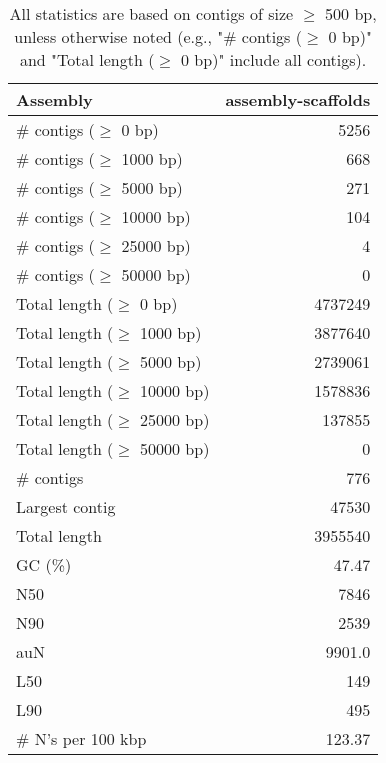 \documentclass[12pt,a4paper]{article}
\begin{document}
\begin{table}[ht]
\begin{center}
\caption{All statistics are based on contigs of size $\geq$ 500 bp, unless otherwise noted (e.g., "\# contigs ($\geq$ 0 bp)" and "Total length ($\geq$ 0 bp)" include all contigs).}
\begin{tabular}{|l*{1}{|r}|}
\hline
Assembly & assembly-scaffolds \\ \hline
\# contigs ($\geq$ 0 bp) & 5256 \\ \hline
\# contigs ($\geq$ 1000 bp) & 668 \\ \hline
\# contigs ($\geq$ 5000 bp) & 271 \\ \hline
\# contigs ($\geq$ 10000 bp) & 104 \\ \hline
\# contigs ($\geq$ 25000 bp) & 4 \\ \hline
\# contigs ($\geq$ 50000 bp) & 0 \\ \hline
Total length ($\geq$ 0 bp) & 4737249 \\ \hline
Total length ($\geq$ 1000 bp) & 3877640 \\ \hline
Total length ($\geq$ 5000 bp) & 2739061 \\ \hline
Total length ($\geq$ 10000 bp) & 1578836 \\ \hline
Total length ($\geq$ 25000 bp) & 137855 \\ \hline
Total length ($\geq$ 50000 bp) & 0 \\ \hline
\# contigs & 776 \\ \hline
Largest contig & 47530 \\ \hline
Total length & 3955540 \\ \hline
GC (\%) & 47.47 \\ \hline
N50 & 7846 \\ \hline
N90 & 2539 \\ \hline
auN & 9901.0 \\ \hline
L50 & 149 \\ \hline
L90 & 495 \\ \hline
\# N's per 100 kbp & 123.37 \\ \hline
\end{tabular}
\end{center}
\end{table}
\end{document}
